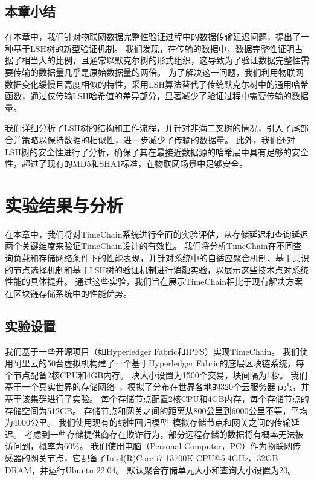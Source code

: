 \section{本章小结}
在本章中，我们针对物联网数据完整性验证过程中的数据传输延迟问题，提出了一种基于LSH树的新型验证机制。
我们发现，在传输的数据中，数据完整性证明占据了相当大的比例，且通常以默克尔树的形式组织，这导致为了验证数据完整性需要传输的数据量几乎是原始数据量的两倍。
为了解决这一问题，我们利用物联网数据变化缓慢且高度相似的特性，采用LSH算法替代了传统默克尔树中的通用哈希函数，通过仅传输LSH哈希值的差异部分，显著减少了验证过程中需要传输的数据量。

我们详细分析了LSH树的结构和工作流程，并针对非满二叉树的情况，引入了尾部合并策略以保持数据的相似性，进一步减少了传输的数据量。
此外，我们还对LSH树的安全性进行了分析，确保了其在最接近数据源的哈希层中具有足够的安全性，超过了现有的MD5和SHA1标准，在物联网场景中足够安全。

\chapter{实验结果与分析}
在本章中，我们将对TimeChain系统进行全面的实验评估，从存储延迟和查询延迟两个关键维度来验证TimeChain设计的有效性。
我们将分析TimeChain在不同查询负载和存储网络条件下的性能表现，并针对系统中的自适应聚合机制、基于共识的节点选择机制和基于LSH树的验证机制进行消融实验，以展示这些技术点对系统性能的具体提升。
通过这些实验，我们旨在展示TimeChain相比于现有解决方案在区块链存储系统中的性能优势。

\section{实验设置}
我们基于一些开源项目（如Hyperledger Fabric和IPFS）实现TimeChain。
我们使用阿里云的50台虚拟机构建了一个基于Hyperledger Fabric的底层区块链系统，每个节点配备2核CPU和4GB内存。
块大小设置为1500个交易，块间隔为1秒。
我们基于一个真实世界的存储网络~\cite{corneo2021surrounded}，模拟了分布在世界各地的320个云服务器节点，并基于该集群进行了实验。
每个存储节点配置2核CPU和4GB内存，每个存储节点的存储空间为512GB。
存储节点和网关之间的距离从800公里到6000公里不等，平均为4000公里。
我们使用现有的线性回归模型~\cite{ziviani2005improving}模拟存储节点和网关之间的传输延迟。
考虑到一些存储提供商存在欺诈行为，部分远程存储的数据将有概率无法被访问到，概率为60\%。
我们使用电脑（Personal Computer，PC）作为物联网传感器的网关节点，它配备了Intel(R)Core i7-13700K CPU@5.4GHz、32GB DRAM，并运行Ubuntu 22.04。
默认聚合存储单元大小和查询大小设置为20。

